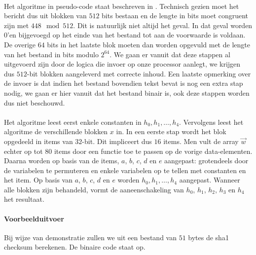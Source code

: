 \paragraph{}
Het algoritme in pseudo-code staat beschreven in .
Technisch gezien moet het bericht dus uit blokken van $512$ bits bestaan en de lengte in bits moet congruent zijn met $448\mod 512$. Dit is natuurlijk niet altijd het geval. In dat geval worden $0$'en bijgevoegd op het einde van het bestand tot aan de voorwaarde is voldaan. De overige $64$ bits in het laatste blok moeten dan worden opgevuld met de lengte van het bestand in bits modulo $2^64$. We gaan er vanuit dat deze stappen al uitgevoerd zijn door de logica die invoer op onze processor aanlegt, we krijgen dus $512$-bit blokken aangeleverd met correcte inhoud. Een laatste opmerking over de invoer is dat indien het bestand bovendien tekst bevat is nog een extra stap nodig, we gaan er hier vanuit dat het bestand binair is, ook deze stappen worden dus niet beschouwd.

\paragraph{}
Het algoritme leest eerst enkele constanten in $h_0,h_1,\ldots,h_4$. Vervolgens leest het algoritme de verschillende blokken $x$ in. In een eerste stap wordt het blok opgedeeld in items van $32$-bit. Dit impliceert dus $16$ items. Men vult de array $\vec{w}$ echter op tot $80$ items door een functie toe te passen op de vorige data-elementen. Daarna worden op basis van de items, $a$, $b$, $c$, $d$ en $e$ aangepast: grotendeels door de variabelen te permuteren en enkele variabelen op te tellen met constanten en het item. Op basis van $a$, $b$, $c$, $d$ en $e$ worden $h_0,h_1,\ldots,h_4$ aangepast. Wanneer alle blokken zijn behandeld, vormt de aaneenschakeling van $h_0$, $h_1$, $h_2$, $h_3$ en $h_4$ het resultaat.

\paragraph{Voorbeelduitvoer}
Bij wijze van demonstratie zullen we uit een bestand van $51$ bytes de sha1 checksum berekenen. De binaire code staat op.

